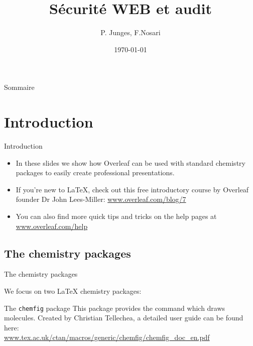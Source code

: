 \documentclass{beamer}
\title[Sécurité WEB et audit]{Sécurité WEB et audit}
\author{P. Junges, F.Nosari}
\institute[F.S.T]{Faculté des Sciences et Technologies}
\date{\today}
\begin{document}
	
	\begin{frame}
		\titlepage
	\end{frame}

	\begin{frame}{Sommaire}
	\tableofcontents
	\end{frame}

\section{Introduction}

	\begin{frame}{Introduction}
	
		\begin{itemize}
		\item In these slides we show how Overleaf can be used with standard chemistry packages to easily create professional presentations.
		\item If you're new to \LaTeX{}, check out this free introductory course by Overleaf founder Dr John Lees-Miller: \url{www.overleaf.com/blog/7}
		\item You can also find more quick tips and tricks on the help pages at \url{www.overleaf.com/help}
		\end{itemize}
	
	
	
	\end{frame}

		\subsection{The chemistry packages}
			\begin{frame}{The chemistry packages}
			
				We focus on two \LaTeX{} chemistry packages:
				\begin{block}{The \texttt{chemfig} package}
				This package provides the command which draws molecules. Created by Christian Tellechea, a detailed user guide can be found here:\\[0.4cm]
				\small{\url{www.tex.ac.uk/ctan/macros/generic/chemfig/chemfig_doc_en.pdf}}
				\end{block}
			
			
			\end{frame}
\end{document}
